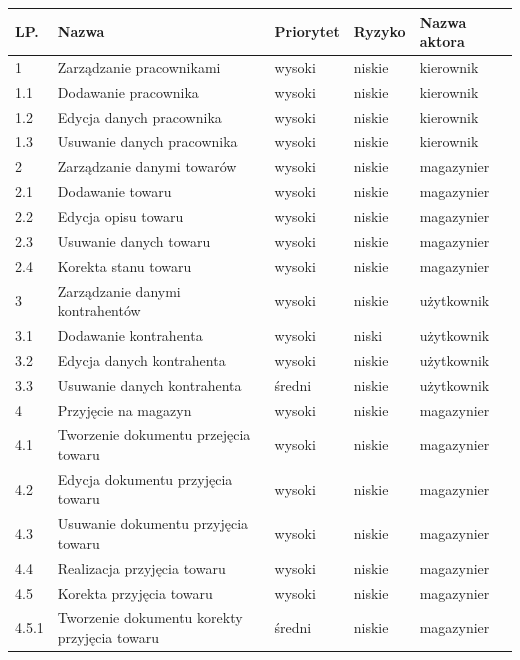 \begin{table}[ht]
	 \begin{center}
	    \begin{tabular}{| l | l | l | l | l |}%
	    	\hline
		    \textbf{LP.} & \textbf{Nazwa}  & \textbf{Priorytet} & \textbf{Ryzyko} &
		    \textbf{Nazwa aktora} \\
		    \hline
			1 & Zarządzanie pracownikami & wysoki & niskie & kierownik \\
		    1.1 & Dodawanie pracownika & wysoki & niskie & kierownik \\
		    1.2 & Edycja danych pracownika & wysoki & niskie & kierownik \\ 	
		    1.3 & Usuwanie danych pracownika & wysoki &niskie & kierownik \\
		    \hline
		    2 & Zarządzanie danymi towarów & wysoki & niskie & magazynier \\
		    2.1 & Dodawanie towaru & wysoki &  niskie & magazynier \\
		    2.2 & Edycja opisu towaru & wysoki & niskie & magazynier \\
		    2.3 & Usuwanie danych towaru & wysoki & niskie & magazynier \\
            2.4 & Korekta stanu towaru & wysoki & niskie & magazynier \\
		    \hline
		   	3 & Zarządzanie danymi kontrahentów & wysoki & niskie & użytkownik \\
		   	3.1 & Dodawanie kontrahenta & wysoki & niski & użytkownik \\
		   	3.2 & Edycja danych kontrahenta & wysoki & niskie & użytkownik \\
		   	3.3 & Usuwanie danych kontrahenta & średni & niskie & użytkownik \\
		   	\hline
            4 & Przyjęcie na magazyn & wysoki & niskie & magazynier \\
		   	4.1 & Tworzenie dokumentu przejęcia towaru & wysoki & niskie & magazynier \\
		   	4.2 & Edycja dokumentu przyjęcia towaru & wysoki & niskie & magazynier \\
		   	4.3 & Usuwanie dokumentu przyjęcia towaru & wysoki & niskie & magazynier \\
		   	4.4 & Realizacja przyjęcia towaru & wysoki & niskie & magazynier \\
		   	4.5 & Korekta przyjęcia towaru & wysoki & niskie & magazynier \\
            4.5.1 & Tworzenie dokumentu korekty przyjęcia towaru & średni & niskie & magazynier \\

\end{tabular}
\end{center}
\end{table}
